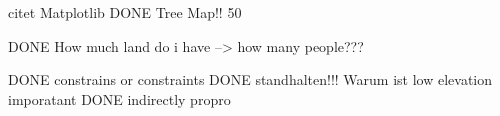 citet Matplotlib
DONE Tree Map!!
50%

DONE How much land do i have --> how many people???

DONE constrains or constraints
DONE standhalten!!!
Warum ist low elevation imporatant
DONE indirectly propro
